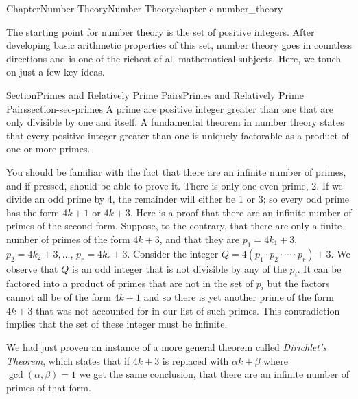 \documentclass[oneside,10pt,]{book}
\numberwithin{equation}{section}
\begin{document}
%
%
\typeout{************************************************}
\typeout{************************************************}
%
\begin{chapterptx}{Chapter}{Number Theory}{}{Number Theory}{}{}{chapter-c-number_theory}
\renewcommand*{\chaptername}{Chapter}
\begin{introduction}{}%
The starting point for number theory is the set of positive integers.  After developing basic arithmetic properties of this set, number theory goes in countless directions and is one of the richest of all mathematical subjects. Here, we touch on just a few key ideas.%
\end{introduction}%
%
%
\typeout{************************************************}
\typeout{************************************************}
%
\begin{sectionptx}{Section}{Primes and Relatively Prime Pairs}{}{Primes and Relatively Prime Pairs}{}{}{section-sec-primes}
A prime are positive integer greater than one that are only divisible by one and itself. A fundamental theorem in number theory states that every positive integer greater than one is uniquely factorable as a product of one or more primes.%
\par
You should be familiar with the fact that there are an infinite number of primes, and if pressed, should be able to prove it.  There is only one even prime, 2. If we divide an odd prime by 4, the remainder will either be 1 or 3; so every odd prime has the form \(4k+1\) or \(4k+3\).  Here is a proof that there are an infinite number of primes of the second form. Suppose, to the contrary, that there are only a finite number of primes of the form \(4k+3\), and that they are  \(p_1=4k_1+3\), \(p_2=4k_2+3, \dots\), \(p_r=4k_r+3\).  Consider the integer \(Q= 4(p_1 \cdot p_2 \cdot \cdots \cdot p_r)+3\).  We observe that \(Q\) is an odd integer that is not divisible by any of the \(p_i\). It can be factored into a product of primes that are not in the set of \(p_i\) but the factors cannot all be of the form \(4k+1\) and so there is yet another prime of the form \(4k+3\) that was not accounted for in our list of such primes.  This contradiction implies that the set of these integer must be infinite.%
\par
We had just proven an instance of a more general theorem called \emph{Dirichlet's Theorem}, which states that if \(4k+3\) is replaced with \(\alpha k + \beta\) where \(\gcd(\alpha,\beta)=1\) we get the same conclusion, that there are an infinite number of primes of that form.%

\end{sectionptx}
\end{chapterptx}
\end{document}

